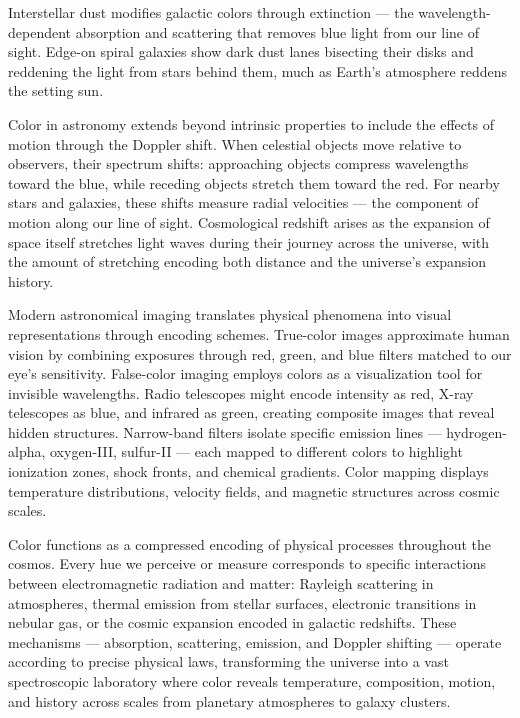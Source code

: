 Interstellar dust modifies galactic colors through extinction — the wavelength-dependent absorption and scattering that removes blue light from our line of sight. Edge-on spiral galaxies show dark dust lanes bisecting their disks and reddening the light from stars behind them, much as Earth's atmosphere reddens the setting sun.

Color in astronomy extends beyond intrinsic properties to include the effects of motion through the Doppler shift. When celestial objects move relative to observers, their spectrum shifts: approaching objects compress wavelengths toward the blue, while receding objects stretch them toward the red. For nearby stars and galaxies, these shifts measure radial velocities — the component of motion along our line of sight. Cosmological redshift arises as the expansion of space itself stretches light waves during their journey across the universe, with the amount of stretching encoding both distance and the universe's expansion history.

Modern astronomical imaging translates physical phenomena into visual representations through encoding schemes. True-color images approximate human vision by combining exposures through red, green, and blue filters matched to our eye's sensitivity. False-color imaging employs colors as a visualization tool for invisible wavelengths. Radio telescopes might encode intensity as red, X-ray telescopes as blue, and infrared as green, creating composite images that reveal hidden structures. Narrow-band filters isolate specific emission lines — hydrogen-alpha, oxygen-III, sulfur-II — each mapped to different colors to highlight ionization zones, shock fronts, and chemical gradients. Color mapping displays temperature distributions, velocity fields, and magnetic structures across cosmic scales.

Color functions as a compressed encoding of physical processes throughout the cosmos. Every hue we perceive or measure corresponds to specific interactions between electromagnetic radiation and matter: Rayleigh scattering in atmospheres, thermal emission from stellar surfaces, electronic transitions in nebular gas, or the cosmic expansion encoded in galactic redshifts. These mechanisms — absorption, scattering, emission, and Doppler shifting — operate according to precise physical laws, transforming the universe into a vast spectroscopic laboratory where color reveals temperature, composition, motion, and history across scales from planetary atmospheres to galaxy clusters.

